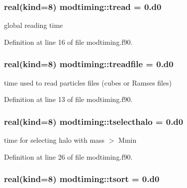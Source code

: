 \subsubsection[{\texorpdfstring{tread}{tread}}]{\setlength{\rightskip}{0pt plus 5cm}real(kind=8) modtiming\+::tread = 0.d0}\hypertarget{namespacemodtiming_ab77d3fc2a7e3da662677204c1c8f7e84}{}\label{namespacemodtiming_ab77d3fc2a7e3da662677204c1c8f7e84}


global reading time 



Definition at line 16 of file modtiming.\+f90.

\subsubsection[{\texorpdfstring{treadfile}{treadfile}}]{\setlength{\rightskip}{0pt plus 5cm}real(kind=8) modtiming\+::treadfile = 0.d0}\hypertarget{namespacemodtiming_ab585192644ed79fc1030fde80dd84f85}{}\label{namespacemodtiming_ab585192644ed79fc1030fde80dd84f85}


time used to read particles files (cubes or Ramses files) 



Definition at line 13 of file modtiming.\+f90.

\subsubsection[{\texorpdfstring{tselecthalo}{tselecthalo}}]{\setlength{\rightskip}{0pt plus 5cm}real(kind=8) modtiming\+::tselecthalo = 0.d0}\hypertarget{namespacemodtiming_a0e46279061d4681c9c8b5a055410f04b}{}\label{namespacemodtiming_a0e46279061d4681c9c8b5a055410f04b}


time for selecting halo with mass $>$ Mmin 



Definition at line 26 of file modtiming.\+f90.

\subsubsection[{\texorpdfstring{tsort}{tsort}}]{\setlength{\rightskip}{0pt plus 5cm}real(kind=8) modtiming\+::tsort = 0.d0}\hypertarget{namespacemodtiming_a32142e111b00eb8590746eef1b1d9dd6}{}\label{namespacemodtiming_a32142e111b00eb8590746eef1b1d9dd6}


